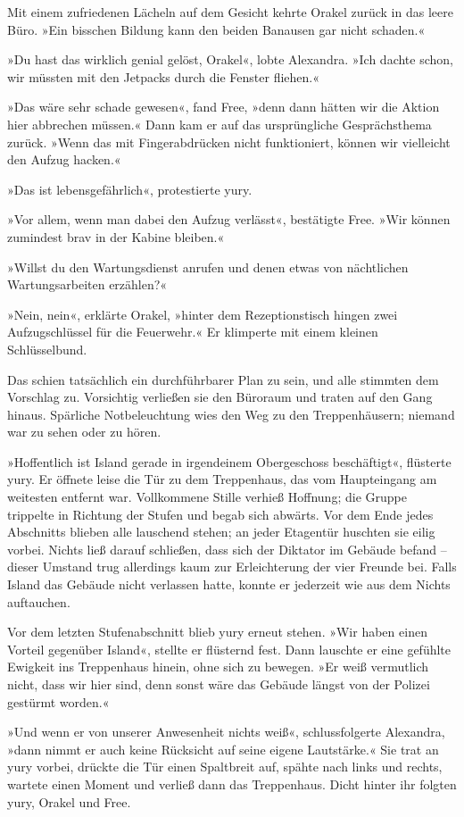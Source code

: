Mit einem zufriedenen Lächeln auf dem Gesicht kehrte Orakel zurück in das leere Büro. »Ein bisschen Bildung kann den beiden Banausen gar nicht schaden.«

»Du hast das wirklich genial gelöst, Orakel«, lobte Alexandra. »Ich dachte schon, wir müssten mit den Jetpacks durch die Fenster fliehen.«

»Das wäre sehr schade gewesen«, fand Free, »denn dann hätten wir die Aktion hier abbrechen müssen.« Dann kam er auf das ursprüngliche Gesprächsthema zurück. »Wenn das mit Fingerabdrücken nicht funktioniert, können wir vielleicht den Aufzug hacken.«

»Das ist lebensgefährlich«, protestierte yury.

»Vor allem, wenn man dabei den Aufzug verlässt«, bestätigte Free. »Wir können zumindest brav in der Kabine bleiben.«

»Willst du den Wartungsdienst anrufen und denen etwas von nächtlichen Wartungsarbeiten erzählen?«

»Nein, nein«, erklärte Orakel, »hinter dem Rezeptionstisch hingen zwei Aufzugschlüssel für die Feuerwehr.« Er klimperte mit einem kleinen Schlüsselbund.

Das schien tatsächlich ein durchführbarer Plan zu sein, und alle stimmten dem Vorschlag zu. Vorsichtig verließen sie den Büroraum und traten auf den Gang hinaus. Spärliche Notbeleuchtung wies den Weg zu den Treppenhäusern; niemand war zu sehen oder zu hören.

»Hoffentlich ist Island gerade in irgendeinem Obergeschoss beschäftigt«, flüsterte yury. Er öffnete leise die Tür zu dem Treppenhaus, das vom Haupteingang am weitesten entfernt war. Vollkommene Stille verhieß Hoffnung; die Gruppe trippelte in Richtung der Stufen und begab sich abwärts. Vor dem Ende jedes Abschnitts blieben alle lauschend stehen; an jeder Etagentür huschten sie eilig vorbei. Nichts ließ darauf schließen, dass sich der Diktator im Gebäude befand – dieser Umstand trug allerdings kaum zur Erleichterung der vier Freunde bei. Falls Island das Gebäude nicht verlassen hatte, konnte er jederzeit wie aus dem Nichts auftauchen.

Vor dem letzten Stufenabschnitt blieb yury erneut stehen. »Wir haben einen Vorteil gegenüber Island«, stellte er flüsternd fest. Dann lauschte er eine gefühlte Ewigkeit ins Treppenhaus hinein, ohne sich zu bewegen. »Er weiß vermutlich nicht, dass wir hier sind, denn sonst wäre das Gebäude längst von der Polizei gestürmt worden.«

»Und wenn er von unserer Anwesenheit nichts weiß«, schlussfolgerte Alexandra, »dann nimmt er auch keine Rücksicht auf seine eigene Lautstärke.« Sie trat an yury vorbei, drückte die Tür einen Spaltbreit auf, spähte nach links und rechts, wartete einen Moment und verließ dann das Treppenhaus. Dicht hinter ihr folgten yury, Orakel und Free.

